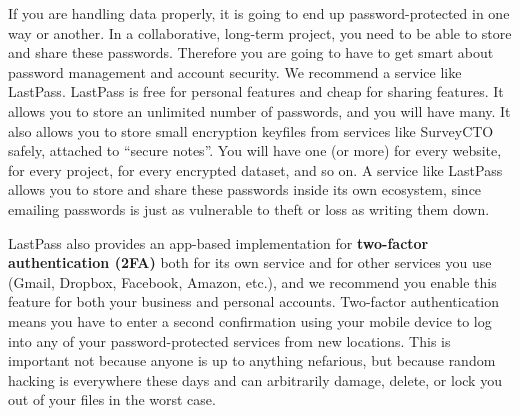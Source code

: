 If you are handling data properly, it is going to end up password-protected in one way or another.
In a collaborative, long-term project, you need to be able to store and share these passwords.
Therefore you are going to have to get smart about password management and account security.
We recommend a service like LastPass.
LastPass is free for personal features and cheap for sharing features.
It allows you to store an unlimited number of passwords, and you will have many.
It also allows you to store small encryption keyfiles from services like SurveyCTO safely, attached to ``secure notes''.
You will have one (or more) for every website, for every project, for every encrypted dataset, and so on.
A service like LastPass allows you to store and share these passwords inside its own ecosystem,
since emailing passwords is just as vulnerable to theft or loss as writing them down.

LastPass also provides an app-based implementation for
\textbf{two-factor authentication (2FA)}
both for its own service and for other services you use (Gmail, Dropbox, Facebook, Amazon, etc.),
and we recommend you enable this feature for both your business and personal accounts.
Two-factor authentication means you have to enter a second confirmation using your mobile device
to log into any of your password-protected services from new locations.
This is important not because anyone is up to anything nefarious,
but because random hacking is everywhere these days
and can arbitrarily damage, delete, or lock you out of your files in the worst case.
